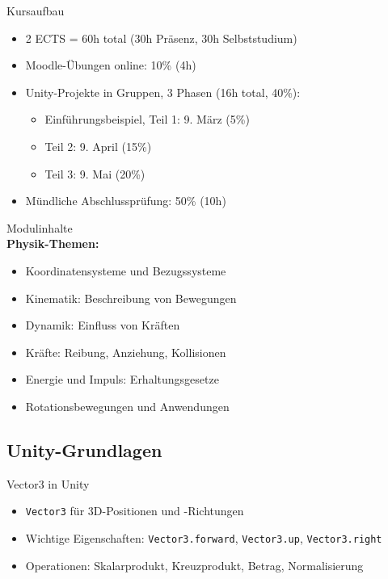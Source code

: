 \begin{definition}{Kursaufbau}
    \begin{itemize}
        \item 2 ECTS = 60h total (30h Präsenz, 30h Selbststudium)
        \item Moodle-Übungen online: 10\% (4h)
        \item Unity-Projekte in Gruppen, 3 Phasen (16h total, 40\%):
        \begin{itemize}
            \item Einführungsbeispiel, Teil 1: 9. März (5\%)
            \item Teil 2: 9. April (15\%)
            \item Teil 3: 9. Mai (20\%)
        \end{itemize}
        \item Mündliche Abschlussprüfung: 50\% (10h)
    \end{itemize}
\end{definition}

\begin{concept}{Modulinhalte}\\
    \textbf{Physik-Themen:}
    \begin{itemize}
        \item Koordinatensysteme und Bezugssysteme
        \item Kinematik: Beschreibung von Bewegungen
        \item Dynamik: Einfluss von Kräften
        \item Kräfte: Reibung, Anziehung, Kollisionen
        \item Energie und Impuls: Erhaltungsgesetze
        \item Rotationsbewegungen und Anwendungen
    \end{itemize}
\end{concept}

\subsection{Unity-Grundlagen}

\begin{definition}{Vector3 in Unity}
    \begin{itemize}
        \item \texttt{Vector3} für 3D-Positionen und -Richtungen
        \item Wichtige Eigenschaften: \texttt{Vector3.forward}, \texttt{Vector3.up}, \texttt{Vector3.right}
        \item Operationen: Skalarprodukt, Kreuzprodukt, Betrag, Normalisierung
    \end{itemize}
\end{definition}

